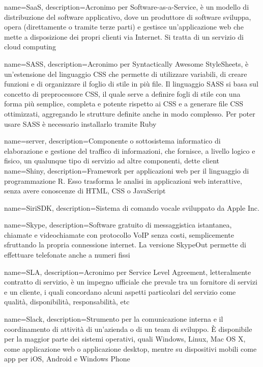 {
	name=SaaS,
	description={Acronimo per Software-as-a-Service, è un modello di distribuzione del software applicativo, dove un produttore di software sviluppa, opera (direttamente o tramite terze parti) e gestisce un'applicazione web che mette a disposizione dei propri clienti via Internet. Si tratta di un servizio di cloud computing}
}

{
	name=SASS,
	description={Acronimo per Syntactically Awesome StyleSheets, è un'estensione del linguaggio CSS che permette di utilizzare variabili, di creare funzioni e di organizzare il foglio di stile in più file. Il linguaggio SASS si basa sul concetto di preprocessore CSS, il quale serve a definire fogli di stile con una forma più semplice, completa e potente rispetto ai CSS e a generare file CSS ottimizzati, aggregando le strutture definite anche in modo complesso. Per poter usare SASS è necessario installarlo tramite Ruby}
}

{
	name=server,
	description={Componente o sottosistema informatico di elaborazione e gestione del traffico di informazioni, che fornisce, a livello logico e fisico, un qualunque tipo di servizio ad altre componenti, dette client}
}
{
	name=Shiny,
	description={Framework per applicazioni web per il linguaggio di programmazione R. Esso trasforma le analisi in applicazioni web interattive, senza avere conoscenze di HTML, CSS o JavaScript}
}

{
	name=SiriSDK,
	description={Sistema di comando vocale sviluppato da Apple Inc. }
}

{
	name=Skype,
	description={Software gratuito di messaggistica istantanea, chiamate e videochiamate con protocollo VoIP senza costi, semplicemente sfruttando la propria connessione internet. La versione SkypeOut permette di effettuare telefonate anche a numeri fissi}
}

{
	name=SLA,
	description={Acronimo per Service Level Agreement, letteralmente contratto di servizio, è un impegno ufficiale che prevale tra un fornitore di servizi e un cliente, i quali concordano alcuni aspetti particolari del servizio come qualità, disponibilità, responsabilità, etc}
}

{
	name=Slack,
	description={Strumento per la comunicazione interna e il coordinamento di attività di un'azienda o di un team di sviluppo. \MakeUppercase{è} disponibile per la maggior parte dei sistemi operativi, quali Windows, Linux, Mac OS X, come applicazione web o applicazione desktop, mentre su dispositivi mobili come app per iOS, Android e Windows Phone}
}

